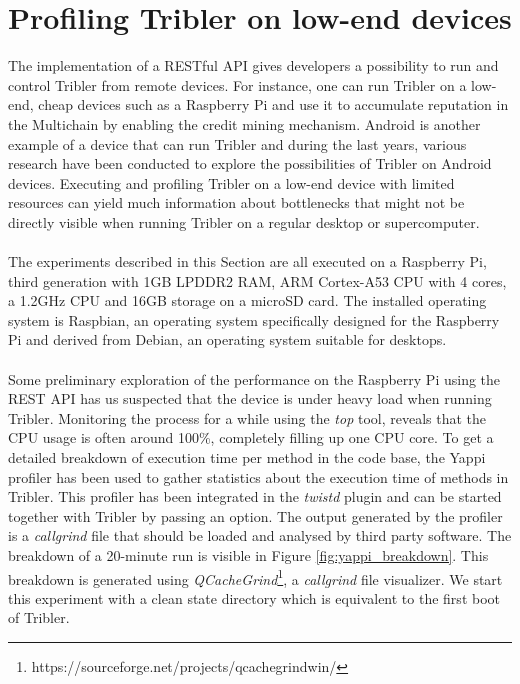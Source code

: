 \section{Profiling Tribler on low-end devices}
\label{sec:profiling_tribler_lowend}
The implementation of a RESTful API gives developers a possibility to run and control Tribler from remote devices. For instance, one can run Tribler on a low-end, cheap devices such as a Raspberry Pi and use it to accumulate reputation in the Multichain by enabling the credit mining mechanism. Android is another example of a device that can run Tribler and during the last years, various research have been conducted to explore the possibilities of Tribler on Android devices\cite{sabee2014tribler}\cite{de2014android}. Executing and profiling Tribler on a low-end device with limited resources can yield much information about bottlenecks that might not be directly visible when running Tribler on a regular desktop or supercomputer.\\\\
The experiments described in this Section are all executed on a Raspberry Pi, third generation with 1GB LPDDR2 RAM, ARM Cortex-A53 CPU with 4 cores, a 1.2GHz CPU and 16GB storage on a microSD card. The installed operating system is Raspbian, an operating system specifically designed for the Raspberry Pi and derived from Debian, an operating system suitable for desktops.\\\\
Some preliminary exploration of the performance on the Raspberry Pi using the REST API has us suspected that the device is under heavy load when running Tribler. Monitoring the process for a while using the \emph{top} tool, reveals that the CPU usage is often around 100\%, completely filling up one CPU core. To get a detailed breakdown of execution time per method in the code base, the Yappi profiler has been used to gather statistics about the execution time of methods in Tribler. This profiler has been integrated in the \emph{twistd} plugin and can be started together with Tribler by passing an option. The output generated by the profiler is a \emph{callgrind} file that should be loaded and analysed by third party software. The breakdown of a 20-minute run is visible in Figure \ref{fig:yappi_breakdown}. This breakdown is generated using \emph{QCacheGrind}\footnote{https://sourceforge.net/projects/qcachegrindwin/}, a \emph{callgrind} file visualizer. We start this experiment with a clean state directory which is equivalent to the first boot of Tribler.

